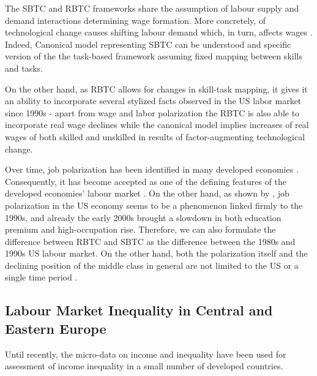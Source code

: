 \documentclass[11pt]{article}
\begin{document}
The SBTC and RBTC frameworks share the assumption of labour supply and demand interactions determining wage formation. More concretely, of technological change causes shifting labour demand which, in turn, affects wages \citep{mishel2013assessing}. Indeed, Canonical model representing SBTC can be understood and specific version of the the task-based framework assuming fixed mapping between skills and tasks.

On the other hand, as RBTC allows for changes in skill-task mapping, it gives it an ability to incorporate several stylized facts observed in the US labor market since 1990s - apart from wage and labor polarization the RBTC is also able to incorporate real wage declines while the canonical model implies increases of real wages of both skilled and unskilled in results of factor-augmenting technological change.


 Over time, job polarization has been identified in many developed economies \citep{rodrik2020economic, oecd2017}. Consequently, it has become accepted as one of the defining features of the developed economies' labour market \citep{howell2019declining}. On the other hand, as shown by \citet{mishel2013assessing}, job polarization in the US economy seems to be a phenomenon linked firmly to the 1990s, and already the early 2000s brought a slowdown in both education premium and high-occupation rise. Therefore, we can also formulate the difference between RBTC and SBTC as the difference between the 1980s and 1990s US labour market. On the other hand, both the polarization itself and the declining position of the middle class in general are not limited to the US or a single time period \citep{temin2018vanishing, rodrik2020economic}. %



\subsection{Labour Market Inequality in Central and Eastern Europe}
Until recently, the micro-data on income and inequality have been used for assessment of income inequality in a small number of developed countries.
\end{document}
